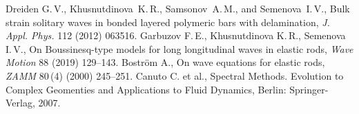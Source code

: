 \documentclass[12pt, a4paper]{article}
\begin{document}
\begin{thebibliography}{99}
	 Dreiden G.\,V., Khusnutdinova~K.\,R., Samsonov~A.\,M., and Semenova~I.\,V., Bulk strain solitary waves in bonded layered polymeric bars with delamination, \textit{J. Appl. Phys.} 112 (2012) 063516.
	 Garbuzov F.\,E., Khusnutdinova K.\,R., Semenova I.\,V., On Boussinesq-type models for long longitudinal waves in elastic rods, \textit{Wave Motion} 88 (2019) 129--143.
	 Bostr\"{o}m A., On wave equations for elastic rods, \textit{ZAMM} 80\,(4) (2000) 245--251. 
	 Canuto C. et al., Spectral Methods. Evolution to Complex Geomenties and Applications to Fluid Dynamics, Berlin: Springer-Verlag, 2007.
\end{thebibliography}
\end{document}
